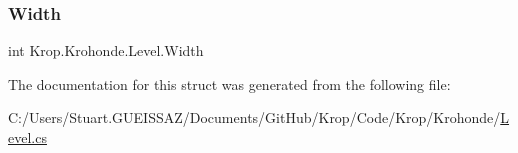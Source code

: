 \mbox{\label{struct_krop_1_1_krohonde_1_1_level_a44e520a8301e4f9d46b1b0feee4a7e9d}} 
\subsubsection{\texorpdfstring{Width}{Width}}
{\footnotesize\ttfamily int Krop.\+Krohonde.\+Level.\+Width\hspace{0.3cm}{\ttfamily [get]}}



The documentation for this struct was generated from the following file\+:\begin{DoxyCompactItemize}
\item 
C\+:/\+Users/\+Stuart.\+G\+U\+E\+I\+S\+S\+A\+Z/\+Documents/\+Git\+Hub/\+Krop/\+Code/\+Krop/\+Krohonde/\mbox{\hyperlink{_level_8cs}{Level.\+cs}}\end{DoxyCompactItemize}
